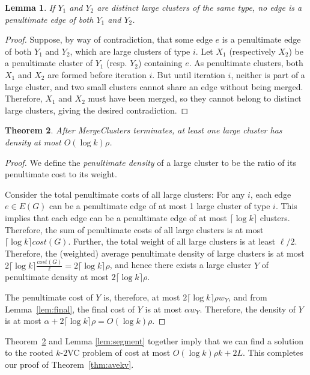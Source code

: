 \documentclass[11pt]{article}
\newtheorem{lemma}{Lemma}[section]
\newtheorem{theorem}[lemma]{Theorem}
\newcommand{\kvc}[1]{$k$-$#1${\sc VC} }
\newcommand{\kv}{\kvc{2}}
\newcommand{\ceil}[1]{\lceil #1 \rceil}
\begin{document}
\begin{lemma}\label{lem:penultimate}
  If $Y_1$ and $Y_2$ are distinct large clusters of the same type, no
  edge is a penultimate edge of both $Y_1$ and $Y_2$.
\end{lemma}
\begin{proof}
  Suppose, by way of contradiction, that some edge $e$ is a
  penultimate edge of both $Y_1$ and $Y_2$, which are large clusters
  of type $i$. Let $X_1$ (respectively $X_2$) be a penultimate cluster
  of $Y_1$ (resp. $Y_2$) containing $e$. As penultimate clusters, both
  $X_1$ and $X_2$ are formed before iteration $i$. But until iteration
  $i$, neither is part of a large cluster, and two small clusters
  cannot share an edge without being merged. Therefore, $X_1$ and
  $X_2$ must have been merged, so they cannot belong to distinct large
  clusters, giving the desired contradiction.
\end{proof}

\begin{theorem}\label{thm:goodLargeCluster}
  After {\sc MergeClusters} terminates, at least one large cluster has
  density at most $O(\log k) \rho$.
\end{theorem}
\begin{proof}
  We define the \emph{penultimate density} of a large cluster to be
  the ratio of its penultimate cost to its weight.

  Consider the total penultimate costs of all large clusters: For any
  $i$, each edge $e \in E(G)$ can be a penultimate edge of at most 1
  large cluster of type $i$. This implies that each edge can be a
  penultimate edge of at most $\ceil{\log k}$ clusters. Therefore, the
  sum of penultimate costs of all large clusters is at most
  $\ceil{\log k} cost(G)$. Further, the total weight of all large
  clusters is at least $\ell/2$.  Therefore, the (weighted) average
  penultimate density of large clusters is at most $2 \ceil{\log k}
  \frac{cost(G)}{\ell} = 2 \ceil{\log k} \rho$, and hence there exists a
  large cluster $Y$ of penultimate density at most $2 \ceil{\log k}
  \rho$.

  The penultimate cost of $Y$ is, therefore, at most $2 \ceil{\log k}
  \rho w_Y$, and from Lemma~\ref{lem:final}, the final cost of $Y$
  is at most $\alpha w_Y$.  Therefore, the density of $Y$ is at most
  $\alpha + 2 \ceil{\log k} \rho = O(\log k) \rho$.
\end{proof}

Theorem~\ref{thm:goodLargeCluster} and Lemma \ref{lem:segment}
together imply that we can find a solution to the rooted \kv problem
of cost at most $O(\log k) \rho k + 2L$. This completes our proof of
Theorem~\ref{thm:avekv}.
\end{document}
